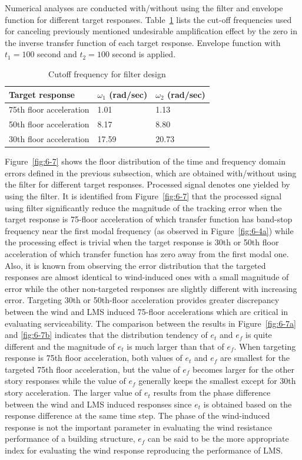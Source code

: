 Numerical analyses are conducted with/without using the filter and envelope function for different target responses. Table~\ref{tab:6-1} lists the cut-off frequencies used for canceling previously mentioned undesirable amplification effect by the zero in the inverse transfer function of each target response. Envelope function with $t_{1}=100$ second and $t_{2}=100$ second is applied.

\begin{table}[ht]
\centering
\begin{tabularx}{\textwidth}{@{}X|X|X@{}}
\toprule[1pt]\midrule[0.3pt]
Target response & $\omega_{1}$ (rad/sec) & $\omega_{2}$ (rad/sec)\\ \hline
75th floor acceleration & 1.01 & 1.13\\
50th floor acceleration & 8.17 & 8.80\\
30th floor acceleration & 17.59 & 20.73\\
\bottomrule
\end{tabularx}
\caption{Cutoff frequency for filter design}
\label{tab:6-1}
\end{table}

Figure~\ref{fig:6-7} shows the floor distribution of the time and frequency domain errors defined in the previous subsection, which are obtained with/without using the filter for different target responses. Processed signal denotes one yielded by using the filter. It is identified from Figure~\ref{fig:6-7} that the processed signal using filter significantly reduce the magnitude of the tracking error when the target response is 75-floor acceleration of which transfer function has band-stop frequency near the first modal frequency (as observed in Figure~\ref{fig:6-4a}) while the processing effect is trivial when the target response is 30th or 50th floor acceleration of which transfer function has zero away from the first modal one. Also, it is known from observing the error distribution that the targeted responses are almost identical to wind-induced ones with a small magnitude of error while the other non-targeted responses are slightly different with increasing error. Targeting 30th or 50th-floor acceleration provides greater discrepancy between the wind and LMS induced 75-floor accelerations which are critical in evaluating serviceability.
The comparison between the results in Figure~\ref{fig:6-7a} and \ref{fig:6-7b} indicates that the distribution tendency of $e_{t}$ and $e_{f}$ is quite different and the magnitude of $e_{t}$ is much larger than that of $e_{f}$. When targeting response is 75th floor acceleration, both values of $e_{t}$ and $e_{f}$ are smallest for the targeted 75th floor acceleration, but the value of $e_{f}$ becomes larger for the other story responses while the value of $e_{f}$ generally keeps the smallest except for 30th story acceleration. The larger value of $e_{t}$ results from the phase difference between the wind and LMS induced responses since $e_{t}$ is obtained based on the response difference at the same time step. The phase of the wind-induced response is not the important parameter in evaluating the wind resistance performance of a building structure, $e_{f}$ can be said to be the more appropriate index for evaluating the wind response reproducing the performance of LMS.


